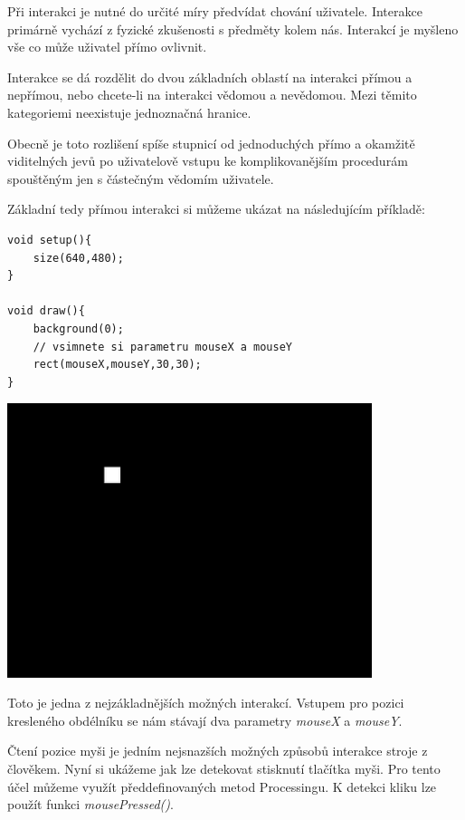 \documentclass[10pt]{book}
\newcommand{\vyraz}[1]{\textit{\gls{#1}}\index{#1}\label{#1}}
\begin{document}
Při interakci je nutné do určité míry předvídat chování uživatele. Interakce primárně vychází z fyzické zkušenosti s předměty kolem nás. Interakcí je myšleno vše co může uživatel přímo ovlivnit.

Interakce se dá rozdělit do dvou základních oblastí na interakci přímou a nepřímou, nebo chcete-li na interakci vědomou a nevědomou. Mezi těmito kategoriemi neexistuje jednoznačná hranice.

Obecně je toto rozlišení spíše stupnicí od jednoduchých přímo a okamžitě viditelných jevů po uživatelově vstupu ke komplikovanějším procedurám spouštěným jen s částečným vědomím uživatele.

Základní tedy přímou interakci si můžeme ukázat na následujícím příkladě:

\begin{lstlisting}
void setup(){
	size(640,480);
}

void draw(){
	background(0);
	// vsimnete si parametru mouseX a mouseY
	rect(mouseX,mouseY,30,30);
}
\end{lstlisting}



\begin{center}
\includegraphics[width = 0.8\textwidth]{imgs/interakce-1.png}
\end{center}

Toto je jedna z nejzákladnějších možných interakcí. Vstupem pro pozici kresleného obdélníku se nám stávají dva parametry \vyraz{mouseX} a \vyraz{mouseY}.

Čtení pozice myši je jedním nejsnazších možných způsobů interakce stroje z člověkem. Nyní si ukážeme jak lze detekovat stisknutí tlačítka myši. Pro tento účel můžeme využít předdefinovaných metod Processingu. K detekci kliku lze použít funkci \vyraz{mousePressed()}.
\end{document}
